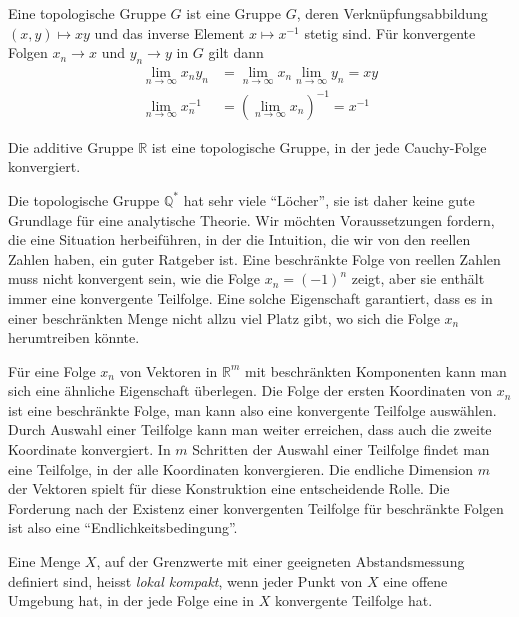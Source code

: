 \begin{definition}
\label{buch:gruppen:gruppe:def:topgruppe}
Eine topologische Gruppe $G$ ist eine Gruppe $G$, deren Verknüpfungsabbildung
$(x,y)\mapsto xy$ und das inverse Element $x\mapsto x^{-1}$ stetig sind.
Für konvergente Folgen $x_n\to x$ und $y_n\to y$ in $G$ gilt dann
\begin{align*}
\lim_{n\to \infty} x_ny_n &= \lim_{n\to\infty} x_n \lim_{n\to\infty} y_n = xy
\\
\lim_{n\to \infty} x_n^{-1} &= (\lim_{n\to\infty} x_n)^{-1} = x^{-1}
\end{align*}
\end{definition}

\begin{beispiel}
Die additive Gruppe $\mathbb{R}$ ist eine topologische Gruppe, in der
jede Cauchy-Folge konvergiert.
\end{beispiel}

Die topologische Gruppe $\mathbb{Q}^*$ hat sehr viele ``Löcher'', sie ist
daher keine gute Grundlage für eine analytische Theorie.
Wir möchten Voraussetzungen fordern, die eine Situation herbeiführen,
in der die Intuition, die wir von den reellen Zahlen haben, ein guter
Ratgeber ist.
Eine beschränkte Folge von reellen Zahlen muss nicht konvergent sein,
wie die Folge $x_n=(-1)^n$ zeigt,
aber sie enthält immer eine konvergente Teilfolge.
Eine solche Eigenschaft garantiert, dass es in einer beschränkten
Menge nicht allzu viel Platz gibt, wo sich die Folge $x_n$ herumtreiben
könnte.

Für eine Folge $x_n$ von Vektoren in $\mathbb{R}^m$ mit beschränkten
Komponenten kann man sich eine ähnliche Eigenschaft überlegen.
Die Folge der ersten Koordinaten von $x_n$ ist eine beschränkte Folge,
man kann also eine konvergente Teilfolge auswählen.
Durch Auswahl einer Teilfolge kann man weiter erreichen, dass auch die
zweite Koordinate konvergiert.
In $m$ Schritten der Auswahl einer Teilfolge findet man eine
Teilfolge, in der alle Koordinaten konvergieren.
Die endliche Dimension $m$ der Vektoren spielt für diese Konstruktion
eine entscheidende Rolle.
Die Forderung nach der Existenz einer konvergenten Teilfolge für beschränkte
Folgen ist also eine ``Endlichkeitsbedingung''.

\begin{definition}
Eine Menge $X$, auf der Grenzwerte mit einer geeigneten Abstandsmessung
definiert sind, heisst {\em lokal kompakt}, wenn jeder Punkt von $X$
eine offene Umgebung hat, in der jede Folge
eine in $X$ konvergente Teilfolge hat.
\end{definition}

